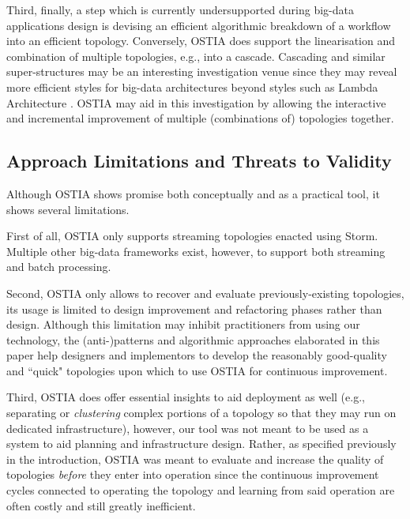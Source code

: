 Third, finally, a step which is currently undersupported during big-data applications design is devising an efficient algorithmic breakdown of a workflow into an efficient topology. Conversely, OSTIA does support the linearisation and combination of multiple topologies, e.g., into a cascade. Cascading and similar super-structures may be an interesting investigation venue since they may reveal more efficient styles for big-data architectures beyond styles such as Lambda Architecture \cite{lambda}. OSTIA may aid in this investigation by allowing the interactive and incremental improvement of multiple (combinations of) topologies together.

\subsection{Approach Limitations and Threats to Validity}\label{lim}

Although OSTIA shows promise both conceptually and as a practical tool, it shows several limitations.

First of all, OSTIA only supports streaming topologies enacted using Storm. Multiple other big-data frameworks exist, however, to support both streaming and batch processing. 

Second, OSTIA only allows to recover and evaluate previously-existing topologies, its usage is limited to design improvement and refactoring phases rather than design. Although this limitation may inhibit practitioners from using our technology, the (anti-)patterns and algorithmic approaches elaborated in this paper help designers and implementors to develop the reasonably good-quality and ``quick" topologies upon which to use OSTIA for continuous improvement.

Third, OSTIA does offer essential insights to aid deployment as well (e.g., separating or \emph{clustering} complex portions of a topology so that they may run on dedicated infrastructure), however, our tool was not meant to be used as a system to aid planning and infrastructure design. Rather, as specified previously in the introduction, OSTIA was meant to evaluate and increase the quality of topologies \emph{before} they enter into operation since the continuous improvement cycles connected to operating the topology and learning from said operation are often costly and still greatly inefficient.

